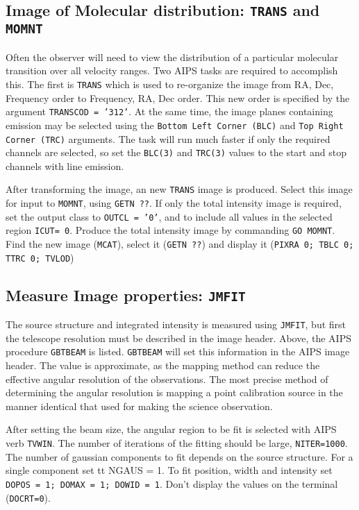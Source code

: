 \documentclass[12pt,twoside]{article}
\begin{document}
\subsection{Image of Molecular distribution: {\tt TRANS} and {\tt MOMNT}}
Often the observer will need to view the distribution of a particular
molecular transition over all velocity ranges.   Two AIPS tasks are
required to accomplish this.   The first is {\tt TRANS} which is
used to re-organize the image from RA, Dec, Frequency order to
Frequency, RA, Dec order.    This new order is specified
by the argument {\tt TRANSCOD = '312'}. 
At the same time, the image planes containing emission may be selected using the 
{\tt Bottom Left Corner (BLC)} and {\tt Top Right Corner (TRC)} arguments.
The task will run much faster if only the required channels are selected, so
set the {\tt BLC(3)} and {\tt TRC(3)} values to the start and stop channels
with line emission.   

After transforming the image, an new {\tt TRANS} image is produced.  Select
this image for input to {\tt MOMNT}, using {\tt GETN ??}.   If only the total
intensity image is required, set the output class to {\tt OUTCL = '0'}, and
to include all values in the selected region {\tt ICUT= 0}.
Produce the total intensity image by commanding {\tt GO MOMNT}.
Find the new image ({\tt MCAT}), select it ({\tt GETN ??}) and display it
({\tt PIXRA 0; TBLC 0; TTRC 0; TVLOD})

\subsection{Measure Image properties: {\tt JMFIT}}
The source structure and integrated intensity is measured using {\tt JMFIT}, but
first the telescope resolution must be described in the image header.   Above,
the AIPS procedure {\tt GBTBEAM} is listed.   
{\tt GBTBEAM} will set this information in the AIPS image header.    
The value is approximate, as the mapping method can reduce the effective
angular resolution of the observations.   The most precise method of determining
the angular resolution is mapping a point calibration source in the manner
identical that used for making the science observation.

After setting the beam size, the angular region to be fit is selected with
AIPS verb {\tt TVWIN}.    The number of iterations of the fitting should
be large, {\tt NITER=1000}.   The number of gaussian components to
fit depends on the source structure.   For a single component set
{tt NGAUS = 1}.   To fit position, width and intensity set 
{\tt DOPOS = 1; DOMAX = 1; DOWID = 1}.
Don't display the values on the terminal ({\tt DOCRT=0}).
  
\end{document}
